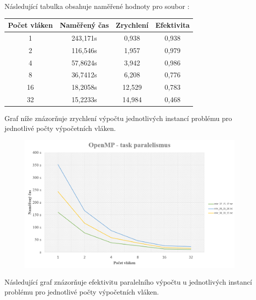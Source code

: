 \documentclass{article}
\begin{document}
\noindent Následující tabulka obsahuje naměřené hodnoty pro soubor :
\begin{table}[H]\centering
    \begin{tabular}{|c|c|c|c|}
        \hline \textbf{Počet vláken} & \textbf{Naměřený čas} & \textbf{Zrychlení} & \textbf{Efektivita} \\ \hline \hline
        1 & 243,171s &  0,938 &	0,938 \\ \hline
        2 & 116,546s & 1,957 & 0,979 \\ \hline
        4 & 57,8624s & 3,942 & 0,986 \\ \hline
        8 & 36,7412s & 6,208 & 0,776 \\ \hline
        16 & 18,2058s & 12,529 & 0,783 \\ \hline
        32 & 15,2233s & 14,984 & 0,468 \\ \hline
    \end{tabular}
\end{table} 

\noindent Graf níže znázorňuje zrychlení výpočtu jednotlivých instancí problému pro jednotlivé počty výpočetních vláken.

\begin{figure}[H]
    \centering
    \includegraphics[width=\textwidth]{OpenMPtaskGraf.png}
\end{figure}

\noindent Následující graf znázorňuje efektivitu paralelního výpočtu u jednotlivých instancí problému pro jednotlivé počty výpočetních vláken.
\end{document}
